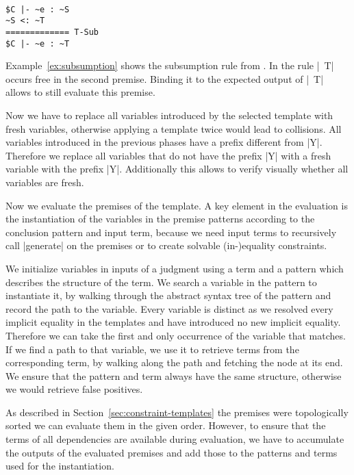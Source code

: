 \begin{example}{~}
\begin{lstlisting}[language=sltc]
$C |- ~e : ~S
~S <: ~T
============= T-Sub
$C |- ~e : ~T
\end{lstlisting}
\label{ex:subsumption}
\end{example}

Example~\ref{ex:subsumption} shows the subsumption rule from
. In the rule \code|~T| occurs free in the second
premise. Binding it to the expected output of \code|~T| allows to
still evaluate this premise.

Now we have to replace all variables introduced by the selected
template with fresh variables, otherwise applying a template twice
would lead to collisions. All variables introduced in the previous
phases have a prefix different from \code|Y|. Therefore we replace all
variables that do not have the prefix \code|Y| with a fresh variable
with the prefix \code|Y|. Additionally this allows to verify visually
whether all variables are fresh.

Now we evaluate the premises of the template. A key element in the
evaluation is the instantiation of the variables in the premise
patterns according to the conclusion pattern and input term, because
we need input terms to recursively call \code|generate| on the
premises or to create solvable (in-)equality
constraints. 

We initialize variables in inputs of a judgment using a term and a
pattern which describes the structure of the term. We search a
variable in the pattern to instantiate it, by walking through the
abstract syntax tree of the pattern and record the path to the
variable. Every variable is distinct as we resolved every implicit
equality in the templates and have introduced no new implicit
equality. Therefore we can take the first and only occurrence of the
variable that matches. If we find a path to that variable, we use it
to retrieve terms from the corresponding term, by walking along the
path and fetching the node at its end. We ensure that the pattern and
term always have the same structure, otherwise we would retrieve false
positives.

As described in Section~\ref{sec:constraint-templates} the premises
were topologically sorted we can evaluate them in the given
order. However, to ensure that the terms of all dependencies are
available during evaluation, we have to accumulate the outputs of the
evaluated premises and add those to the patterns and terms used for
the instantiation.

